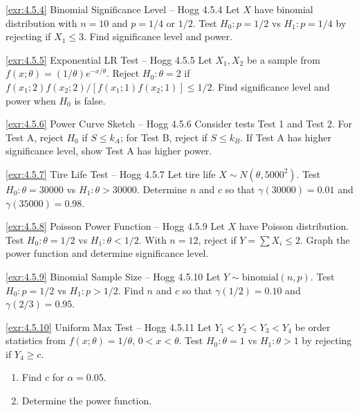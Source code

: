 \begin{exercise}{\ref{exr:4.5.4} Binomial Significance Level – Hogg 4.5.4}\label{exr:4.5.4}
Let $X$ have binomial distribution with $n=10$ and $p=1/4$ or $1/2$. Test $H_0: p=1/2$ vs $H_1: p=1/4$ by rejecting if $X_1 \leq 3$. Find significance level and power.
\end{exercise}

\begin{exercise}{\ref{exr:4.5.5} Exponential LR Test – Hogg 4.5.5}\label{exr:4.5.5}
Let $X_1,X_2$ be a sample from $f(x;\theta)=(1/\theta)e^{-x/\theta}$. Reject $H_0: \theta=2$ if $f(x_1;2)f(x_2;2)/[f(x_1;1)f(x_2;1)] \leq 1/2$. Find significance level and power when $H_0$ is false.
\end{exercise}

\begin{exercise}{\ref{exr:4.5.6} Power Curve Sketch – Hogg 4.5.6}\label{exr:4.5.6}
Consider tests Test 1 and Test 2. For Test A, reject $H_0$ if $S \leq k_A$; for Test B, reject if $S \leq k_B$. If Test A has higher significance level, show Test A has higher power.
\end{exercise}

\begin{exercise}{\ref{exr:4.5.7} Tire Life Test – Hogg 4.5.7}\label{exr:4.5.7}
Let tire life $X \sim N(\theta, 5000^2)$. Test $H_0: \theta=30000$ vs $H_1: \theta>30000$. Determine $n$ and $c$ so that $\gamma(30000)=0.01$ and $\gamma(35000)=0.98$.
\end{exercise}

\begin{exercise}{\ref{exr:4.5.8} Poisson Power Function – Hogg 4.5.9}\label{exr:4.5.8}
Let $X$ have Poisson distribution. Test $H_0: \theta=1/2$ vs $H_1: \theta<1/2$. With $n=12$, reject if $Y=\sum X_i \leq 2$. Graph the power function and determine significance level.
\end{exercise}

\begin{exercise}{\ref{exr:4.5.9} Binomial Sample Size – Hogg 4.5.10}\label{exr:4.5.9}
Let $Y \sim \text{binomial}(n,p)$. Test $H_0: p=1/2$ vs $H_1: p>1/2$. Find $n$ and $c$ so that $\gamma(1/2)=0.10$ and $\gamma(2/3)=0.95$.
\end{exercise}

\begin{exercise}{\ref{exr:4.5.10} Uniform Max Test – Hogg 4.5.11}\label{exr:4.5.10}
Let $Y_1<Y_2<Y_3<Y_4$ be order statistics from $f(x;\theta)=1/\theta$, $0<x<\theta$. Test $H_0: \theta=1$ vs $H_1: \theta>1$ by rejecting if $Y_4 \geq c$.
\begin{enumerate}
\item[(a)] Find $c$ for $\alpha=0.05$.
\item[(b)] Determine the power function.
\end{enumerate}
\end{exercise}


